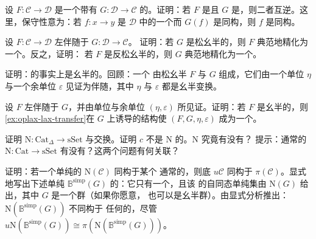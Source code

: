 \begin{exercise}\label{ex:mutually-inverse-conservative}
设 $F\colon \mathcal{C} \to \mathcal{D}$ 是一个带有\trRightAdjoint{}%
$G\colon \mathcal{D} \to \mathcal{C}$ 的\trFunctor{}。证明：若 $F$ 是\trFullyFaithful{}且
$G$ 是\trConservative{}，则二者互逆。这里，保守性意为：若 $f\colon x \to y$ 是
$\mathcal{D}$ 中的一个\trMorphism{}而 $G(f)$ 是同构，则 $f$ 是同构。
\end{exercise}

\begin{exercise}\label{ex:oplax-lax-transfer}
设 $F\colon \mathcal{C} \to \mathcal{D}$ 左伴随于 $G\colon \mathcal{D} \to \mathcal{C}$。
证明：若 $G$ 是松幺半的，则 $F$ 典范地精化为一个\trOplaxMonoidalFunctor{}。反之，证明：
若 $F$ 是反松幺半的，则 $G$ 典范地精化为一个\trLaxMonoidalFunctor{}。
\end{exercise}

\begin{exercise}\label{ex:monoidal-adjunction-left-adjoint-monoidal}
证明：\trMonoidalAdjunction{}的\trLeftAdjoint{}事实上是幺半的。回顾：一个%
\trMonoidalAdjunction{}由松幺半\trFunctor{} $F$ 与 $G$ 组成，它们由一个单位 $\eta$
与一个余单位 $\varepsilon$ 见证为伴随，其中 $\eta$ 与 $\varepsilon$ 都是幺半变换。
\end{exercise}

\begin{exercise}\label{ex:monoidal-f-adjunction}
设 $F$ 左伴随于 $G$，并由单位与余单位 $(\eta, \varepsilon)$ 所见证。证明：若 $F$
是幺半的，则\cref{ex:oplax-lax-transfer}在 $G$ 上诱导的\trLaxMonoidalFunctor{}结构使
$(F, G, \eta, \varepsilon)$ 成为一个\trMonoidalAdjunction{}。
\end{exercise}

\begin{exercise}\label{ex:coherent-nerve-coproducts}
证明\trCoherentNerve{}\trFunctor{}%
$\mathrm{N}\colon \mathrm{Cat}_{\Delta} \to \mathrm{sSet}$ 与\trCoproduct{}交换。证明
$c$ 不是 $\mathrm{N}$ 的\trRightAdjoint{}。$\mathrm{N}$ 究竟有没有\trRightAdjoint{}？
提示：通常的\trNerve{}\trFunctor{} $\mathrm{N}\colon \mathrm{Cat} \to \mathrm{sSet}$
有没有\trRightAdjoint{}？这两个问题有何关联？
\end{exercise}

\begin{exercise}\label{ex:coherent-nerve-bsimp}
证明：若一个单纯\trCategory{}的\trCoherentNerve{} $\mathrm{N}(\mathcal{C})$ 同构于某个
通常\trCategory{}的\trNerve{}，则底\trCategory{} $u\mathcal{C}$ 同构于\trHomotopyCategory{}%
$\pi(\mathcal{C})$。显式地写出下述单纯\trCategory{}%
$\mathbb{B}^{\mathrm{simp}}(G)$ 的\trCoherentNerve{}：它只有一个\trObject{}，且该%
\trObject{}的自同态单纯集由 $\mathrm{N}(G)$ 给出，其中 $G$ 是一个群（如果你愿意，
也可以是幺半群）。由显式分析推出：$\mathrm{N}(\mathbb{B}^{\mathrm{simp}}(G))$ 不同构于
任何\trCategory{}的\trNerve{}，尽管 $u\mathrm{N}(\mathbb{B}^{\mathrm{simp}}(G)) \cong \pi(\mathrm{N}(\mathbb{B}^{\mathrm{simp}}(G)))$。
\end{exercise}

